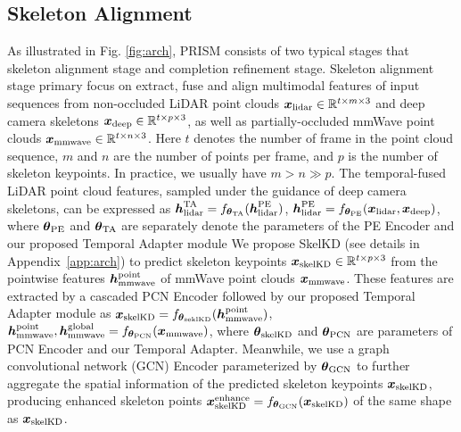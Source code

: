 \documentclass{article}
\begin{document}
\subsection{Skeleton Alignment}
\label{sec:overview}
As illustrated in Fig. \ref{fig:arch}, PRISM consists of two typical stages that skeleton alignment stage and completion refinement stage.
Skeleton alignment stage primary focus on extract, fuse and align multimodal features of input sequences from non-occluded LiDAR point clouds $\boldsymbol{x}_{\rm{lidar}} \in \mathbb{R}^{t \times m \times 3}$ and deep camera skeletons $\boldsymbol{x}_{\rm{deep}} \in \mathbb{R}^{t \times p \times 3}$, as well as partially-occluded mmWave point clouds $\boldsymbol{x}_{\rm{mmwave}} \in \mathbb{R}^{t \times n \times 3}$. Here $t$ denotes the number of frame in the point cloud sequence, $m$ and $n$ are the number of points per frame, and $p$ is the number of skeleton keypoints. In practice, we usually have $m > n \gg p$.
The temporal-fused LiDAR point cloud features, sampled under the guidance of deep camera skeletons, can be expressed as $\boldsymbol{h}_{\rm{lidar}}^{\rm{TA}}=f_{\boldsymbol{\theta}_{\rm{TA}}}(\boldsymbol{h}_{\rm{lidar}}^{\rm{PE}})$, $\boldsymbol{h}_{\rm{lidar}}^{\rm{PE}}=f_{\boldsymbol{\theta}_{\rm{PE}}}(\boldsymbol{x}_{\rm{lidar}}, \boldsymbol{x}_{\rm{deep}})$, where 
$\boldsymbol{\theta}_{\rm{PE}}$ and $\boldsymbol{\theta}_{\rm{TA}}$ are separately denote the parameters of the PE Encoder \cite{yuan2018pcn} and our proposed Temporal Adapter module 
We propose SkelKD
(see details in Appendix~\ref{app:arch})
to predict skeleton keypoints $\boldsymbol{x}_{\rm{skelKD}} \in \mathbb{R}^{t \times p \times 3}$ from the pointwise features $\boldsymbol{h}_{\rm{mmwave}}^{\rm{point}}$ of mmWave point clouds $\boldsymbol{x}_{\rm{mmwave}}$. These features are extracted by a cascaded PCN Encoder \cite{kipf2016semi} followed by our proposed Temporal Adapter module as $\boldsymbol{x}_{\rm{skelKD}}=f_{\boldsymbol{\theta}_{\rm{seklKD}}}(\boldsymbol{h}_{\rm{mmwave}}^{\rm{point}})$, $\boldsymbol{h}_{\rm{mmwave}}^{\rm{point}}, \boldsymbol{h}_{\rm{mmwave}}^{\rm{global}}=f_{\boldsymbol{\theta}_{\rm{PCN}}}(\boldsymbol{x}_{\rm{mmwave}})$, where $\boldsymbol{\theta}_{\rm{skelKD}}$ and $\boldsymbol{\theta}_{\rm{PCN}}$ are parameters of PCN Encoder and our Temporal Adapter. Meanwhile, we use a graph convolutional network (GCN) Encoder \cite{tang2022lake} parameterized by $\boldsymbol{\theta}_{\rm{GCN}}$ to further aggregate the spatial information of the predicted skeleton keypoints $\boldsymbol{x}_{\rm{skelKD}}$, producing enhanced skeleton points $\boldsymbol{x}_{\rm{skelKD}}^{\rm{enhance}}=f_{\boldsymbol{\theta}_{\rm{GCN}}}(\boldsymbol{x}_{\rm{skelKD}})$ of the same shape as $\boldsymbol{x}_{\rm{skelKD}}$.
\end{document}
